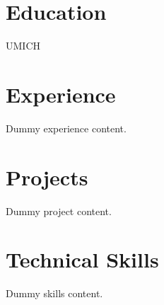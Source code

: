 \documentclass{article}
\begin{document}
\section{Education}
UMICH
\section{Experience}
Dummy experience content.
\section{Projects}
Dummy project content.
\section{Technical Skills}
Dummy skills content.
\end{document}
